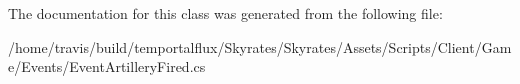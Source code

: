 The documentation for this class was generated from the following file\-:\begin{DoxyCompactItemize}
\item 
/home/travis/build/temportalflux/\-Skyrates/\-Skyrates/\-Assets/\-Scripts/\-Client/\-Game/\-Events/Event\-Artillery\-Fired.\-cs\end{DoxyCompactItemize}
